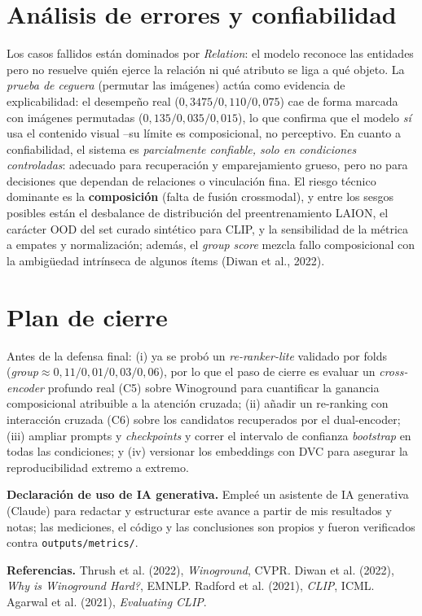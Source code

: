\documentclass[10pt,a4paper]{article}
\begin{document}
\section{Análisis de errores y confiabilidad}
Los casos fallidos están dominados por \emph{Relation}: el modelo reconoce las entidades pero no
resuelve quién ejerce la relación ni qué atributo se liga a qué objeto. La \emph{prueba de ceguera}
(permutar las imágenes) actúa como evidencia de explicabilidad: el desempeño real
($0{,}3475/0{,}110/0{,}075$) cae de forma marcada con imágenes permutadas
($0{,}135/0{,}035/0{,}015$), lo que confirma que el modelo \emph{sí} usa el contenido visual --su
límite es composicional, no perceptivo. En cuanto a confiabilidad, el sistema es
\emph{parcialmente confiable, solo en condiciones controladas}: adecuado para recuperación y
emparejamiento grueso, pero no para decisiones que dependan de relaciones o vinculación fina. El
riesgo técnico dominante es la \textbf{composición} (falta de fusión crossmodal), y entre los
sesgos posibles están el desbalance de distribución del preentrenamiento LAION, el carácter OOD del
set curado sintético para CLIP, y la sensibilidad de la métrica a empates y normalización; además,
el \emph{group score} mezcla fallo composicional con la ambigüedad intrínseca de algunos ítems
(Diwan et al., 2022).

\section{Plan de cierre}
Antes de la defensa final: (i) ya se probó un \emph{re-ranker-lite} validado por folds
(\emph{group}$\approx0{,}11/0{,}01/0{,}03/0{,}06$), por lo que el paso de cierre es evaluar un
\emph{cross-encoder} profundo real (C5) sobre Winoground para cuantificar la ganancia composicional
atribuible a la atención cruzada; (ii) añadir
un re-ranking con interacción cruzada (C6) sobre los candidatos recuperados por el dual-encoder;
(iii) ampliar prompts y \emph{checkpoints} y correr el intervalo de confianza \emph{bootstrap} en
todas las condiciones; y (iv) versionar los embeddings con DVC para asegurar la reproducibilidad
extremo a extremo.

\vspace{0.4em}
\footnotesize
\textbf{Declaración de uso de IA generativa.} Empleé un asistente de IA generativa (Claude) para
redactar y estructurar este avance a partir de mis resultados y notas; las mediciones, el código y
las conclusiones son propios y fueron verificados contra \texttt{outputs/metrics/}.

\textbf{Referencias.} Thrush et al. (2022), \emph{Winoground}, CVPR. Diwan et al. (2022),
\emph{Why is Winoground Hard?}, EMNLP. Radford et al. (2021), \emph{CLIP}, ICML. Agarwal et al.
(2021), \emph{Evaluating CLIP}.
\end{document}
